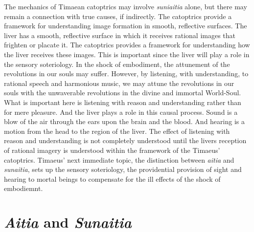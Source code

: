The mechanics of Timaean catoptrics may involve \emph{suniaitia} alone, but there may remain a connection with true causes, if indirectly. The catoptrics provide a framework for understanding image formation in smooth, reflective surfaces. The liver has a smooth, reflective surface in which it receives rational images that frighten or placate it. The catoptrics provides a framework for understanding how the liver receives these images. This is important since the liver will play a role in the sensory soteriology. In the shock of embodiment, the attunement of the revolutions in our souls may suffer. However, by listening, with understanding, to rational speech and harmonious music, we may attune the revolutions in our souls with the unwaverable revolutions in the divine and immortal World-Soul. What is important here is listening with reason and understanding rather than for mere pleasure. And the liver plays a role in this causal process. Sound is a blow of the air through the ears upon the brain and the blood. And hearing is a motion from the head to the region of the liver. The effect of listening with reason and understanding is not completely understood until the livers reception of rational imagery is understood within the framework of the Timaeus' catoptrics. Timaeus' next immediate topic, the distinction between \emph{aitia} and \emph{sunaitia}, sets up the sensory soteriology, the providential provision of sight and hearing to mortal beings to compensate for the ill effects of the shock of embodiemnt. 


\section{\emph{Aitia} and \emph{Sunaitia}} %
\label{sec:_emph_aitia_and_emph_sunaitia}

